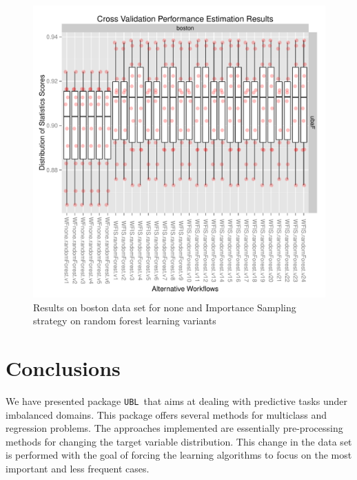 \documentclass[10pt,a4paper]{article}\usepackage[]{graphicx}\usepackage[]{color}
\makeatletter
\def\maxwidth{ %
  \ifdim\Gin@nat@width>\linewidth
    \linewidth
  \else
    \Gin@nat@width
  \fi
}
\newenvironment{knitrout}{}{} %
\newcommand{\UBL}{package \texttt{UBL}\ }
\makeatother
\begin{document}
\begin{knitrout}\footnotesize
{}\color{fgcolor}\begin{figure}

{\centering \includegraphics[width=\maxwidth]{figures/UBL-boston_plot1-1} 

}

\caption[Results on boston data set for none and Importance Sampling strategy on random forest learning variants]{Results on boston data set for none and Importance Sampling strategy on random forest learning variants}\label{fig:boston_plot1}
\end{figure}


\end{knitrout}


\section{Conclusions}

We have presented \UBL that aims at dealing with predictive tasks under imbalanced domains. This package offers several methods for multiclass and regression problems. The approaches implemented are essentially pre-processing methods for changing the target variable distribution. This change in the data set is performed with the goal of forcing the learning algorithms to focus on the most important and less frequent cases. 
\end{document}
